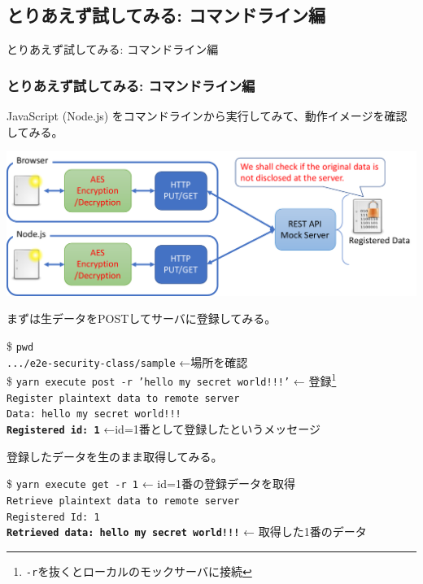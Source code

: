 \documentclass[12pt,dvipdfmx]{beamer}
\begin{document}
\subsection{とりあえず試してみる: コマンドライン編}
\begin{frame}
\centering
{\Large とりあえず試してみる: コマンドライン編}
\end{frame}

\begin{frame}
\frametitle{とりあえず試してみる: コマンドライン編}
JavaScript (Node.js) をコマンドラインから実行してみて、動作イメージを確認してみる。
\begin{center}
\includegraphics[width=\linewidth]{Figs/mock_flow.pdf}
\end{center}
\end{frame}

\begin{frame}
まずは生データをPOSTしてサーバに登録してみる。
\begin{exampleblock}{}\footnotesize
\$ \texttt{pwd}\\
\texttt{.../e2e-security-class/sample} ←場所を確認\\[1ex]
\$ \texttt{yarn execute post -r 'hello my secret world!!!'} ← \alert{登録}\footnote[frame]{\texttt{-r}を抜くとローカルのモックサーバに接続}\\
\texttt{Register plaintext data to remote server}\\
\texttt{Data: hello my secret world!!!}\\
\textbf{\texttt{Registered id: 1}} ←\alert{id=1番として登録したというメッセージ}
\end{exampleblock}

登録したデータを生のまま取得してみる。
\begin{exampleblock}{}\footnotesize
\$ \texttt{yarn execute get -r 1} ← \alert{id=1番の登録データを取得}\\
\texttt{Retrieve plaintext data to remote server}\\
\texttt{Registered Id: 1}\\
\textbf{\texttt{Retrieved data: hello my secret world!!!}} ← \alert{取得した1番のデータ}
\end{exampleblock}
\end{frame}
\end{document}
